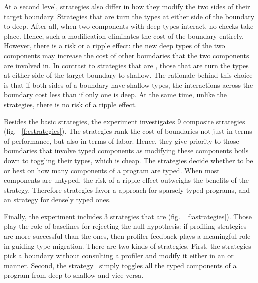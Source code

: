  At a second level, strategies also differ in how they modify the two sides of
 their target boundary. Strategies that are \optkw{} turn the types at
 either side of the boundary to deep. After all, when two components with
 deep types interact, no checks take place. Hence, such a modification
 eliminates the cost of the boundary entirely. However, there is a risk or
 a ripple effect: the new deep types of the two components may increase
 the cost of other boundaries that the two components are involved in. In
 contrast to strategies that are \optkw{}, those that are \conkw{} turn
 the types at either side of the target boundary to shallow. The rationale
 behind this choice is that if both sides of a boundary have
 shallow types, the interactions across the boundary cost less than if
 only one is deep. At the same time, unlike the  \optkw{}
 strategies,  there is no risk of a ripple effect. 

 Besides the basic strategies, the experiment investigates 9 composite
 strategies (fig. ~\ref{f:cstrategies}). The \costkw{} strategies rank the cost of boundaries 
 not just in terms of performance, but also in terms of labor. 
 Hence, they give priority to those
 boundaries that involve typed components as modifying these components
 boils down to toggling their types, which is cheap. The \confkw{}
 strategies
 decide whether to be \optkw{} or \conkw{} best on how many components of
 a program are typed. When most components are untyped, the risk of a ripple effect
 outweighs the benefits of 
 the \optkw{} strategy. Therefore strategies favor a \conkw{} approach for
 sparsely typed programs, and an \optkw{} strategy for densely typed ones.

 Finally, the experiment includes 3 strategies that are \agnostickw{}
 (fig. ~\ref{f:astrategies}). Those
 play the role of baselines for rejecting the null-hypothesis: if 
 profiling strategies are more successful than the
 \agnostickw{} ones, then profiler feedback plays a meaningful role in
 guiding type migration. There are two kinds of  \agnostickw{} strategies. 
 First, the \randkw{} strategies pick a boundary without consulting a profiler
 and modify it either in an \optkw{} or \conkw{} manner. Second, the
 \togglekw{} strategy~\cite{g-dsgt} simply toggles all the typed components of a program
 from deep to shallow and vice versa. 

